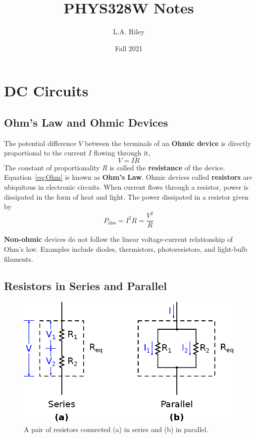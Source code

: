 \documentclass[11pt]{article}
\title{PHYS328W Notes} \author{L.A. Riley} \date{Fall 2021}
\begin{document}
\thispagestyle{empty}

\maketitle

\section{DC Circuits}

\subsection{Ohm's Law and Ohmic Devices}
\label{sec:ohm}

The potential difference $V$ between the terminals of an \textbf{Ohmic
device} is directly proportional to the current $I$ flowing through it,
\begin{equation}
  V=IR
\label{eq:Ohm}
\end{equation}
The constant of proportionality $R$ is called the \textbf{resistance}
of the device. Equation~\ref{eq:Ohm} is known as \textbf{Ohm's
Law}. Ohmic devices called \textbf{resistors} are ubiquitous in
electronic circuits. When current flows through a resistor, power is
dissipated in the form of heat and light. The power dissipated in a
resistor given by
\begin{equation}
  P_\mathrm{diss} = I^2 R = \frac{V^2}{R}
\end{equation}

\textbf{Non-ohmic} devices do not follow the linear voltage-current
relationship of Ohm's law. Examples include diodes, thermistors,
photoresistors, and light-bulb filaments.

\subsection{Resistors in Series and Parallel}
\label{sec:serpar}

\begin{figure}[ht]
  \begin{center}
    \includegraphics{seriesparallel.eps}
    \caption{A pair of resistors connected (a) in series and (b) in
      parallel.}
    \label{fig:seriesparallel}
  \end{center}
\end{figure}
\end{document}
